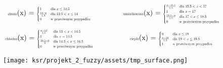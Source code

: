 \documentclass{article}
\begin{document}
\begin{equation*}
\begin{minipage}{0.5\textwidth}
\centering
\text{\scalebox{0.5}{zimna}}(x) = \scalebox{0.5}{$
\begin{cases} 
1 & \text{dla } x \leq 12.5 \\
\frac{14 - x}{1.5} & \text{dla } 12.5 < x \leq 14 \\
0 & \text{w przeciwnym przypadku}
\end{cases}
$}
\end{minipage}%
\begin{minipage}{0.5\textwidth}
\centering
\text{\scalebox{0.5}{umiarkowana}}(x) = \scalebox{0.5}{$
\begin{cases} 
\frac{x - 15.5}{1.5} & \text{dla } 15.5 < x < 17 \\
1 & \text{dla } x = 17 \\
\frac{18.5 - x}{1.5} & \text{dla } 17 < x \leq 18.5 \\
0 & \text{w przeciwnym przypadku}
\end{cases}
$}
\end{minipage}
\end{equation*}
\begin{equation*}
\begin{minipage}{0.5\textwidth}
\centering
\text{\scalebox{0.5}{chłodna}}(x) = \scalebox{0.5}{$
\begin{cases} 
\frac{x - 13}{1.5} & \text{dla } 13 < x < 14.5 \\
1 & \text{dla } x = 14.5 \\
\frac{16.5 - x}{2} & \text{dla } 14.5 < x \leq 16.5 \\
0 & \text{w przeciwnym przypadku}
\end{cases}
$}
\end{minipage}%
\begin{minipage}{0.5\textwidth}
\centering
\text{\scalebox{0.5}{ciepła}}(x) = \scalebox{0.5}{$
\begin{cases} 
0 & \text{dla } x \leq 18 \\
\frac{x - 18}{1.5} & \text{dla } 18 < x \leq 19.5 \\
1 & \text{w przeciwnym przypadku}
\end{cases}
$}
\end{minipage}
\end{equation*}




\begin{figure}[H]
\centering
\texttt{[image: ksr/projekt\_2\_fuzzy/assets/tmp\_surface.png]}
\label{fig:epsilon_bat}
\end{figure}
\end{document}
